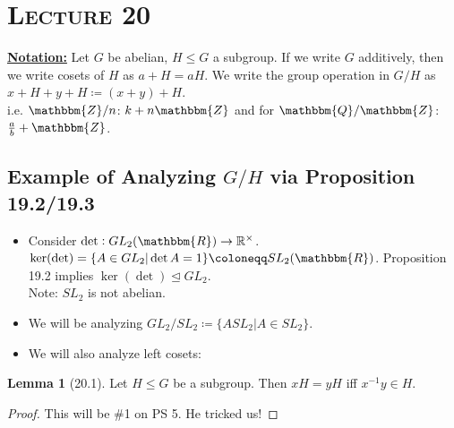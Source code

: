\documentclass{article}
\newcommand{\Z}{\mathbbm{Z}}
\newcommand{\Q}{\mathbbm{Q}}
\newcommand{\R}{\mathbbm{R}}
\newcommand{\coleq}{\coloneqq}
\newcommand{\inverse}[1]{#1^{-1}}
\newcommand{\define}[1]{\textbf{\underline{#1}}}
\newcommand{\func}[3]{#1: #2 \to #3}
\theoremstyle{definition}
\newtheorem*{lem}{Lemma}
\theoremstyle{remark}
\newcommand{\Rx}{\mathbb{R}^\times}
\newcommand{\normal}{\unlhd}
\begin{document}
    \section*{\textbf{\textsc{Lecture 20}}}{
        \define{Notation:} Let $G$ be abelian, $H\leq G$ a subgroup. If we write $G$ additively, then we write cosets of $H$ as $a+H=aH$. We write the group operation in $G/H$ as $x+H+y+H\coleq (x+y)+H$.\\
        i.e. $\Z/n$: $k+n\Z$ and for $\Q/\Z$: $\frac{a}{b}+\Z$.
        
        \subsection*{Example of Analyzing $G/H$ via Proposition 19.2/19.3}{
            \begin{itemize}
                \item Consider $\func{\det}{GL_2(\R)}{\Rx}$.\\
                $\ker(\det)=\{A\in GL_2|\det A =1\}\coleq SL_2(\R)$. Proposition 19.2 implies $\ker(\det)\normal GL_2$.\\
                Note: $SL_2$ is not abelian.
                \item We will be analyzing $GL_2/SL_2\coleq\{ASL_2|A\in SL_2\}$.
                \item We will also analyze left cosets:
            \end{itemize}
            
            \begin{lem}[20.1]
                Let $H\leq G$ be a subgroup. Then $xH=yH$ iff $\inverse{x}y\in H$.
            \end{lem}
            
            \begin{proof}
                This will be \#1 on PS 5. He tricked us!
            \end{proof}
            
}}
\end{document}

